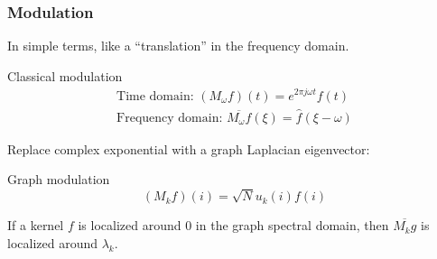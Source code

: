 \documentclass{beamer}
\begin{document}
\begin{frame}
  \frametitle{Modulation}

  In simple terms, like a ``translation'' in the frequency domain.
  
  \begin{block}{Classical modulation}
    \begin{equation}
      \begin{split}
        \text{Time domain: } (M_\omega f)(t) = e^{2 \pi j \omega t} f(t) \\
        \text{Frequency domain: } \overline{M_\omega f}(\xi) = \hat{f}(\xi -
        \omega)
      \end{split}
    \end{equation}
  \end{block}  

  Replace complex exponential with a graph Laplacian eigenvector:
  
  \begin{block}{Graph modulation}
    \begin{equation}
      (M_kf)(i) = \sqrt{N} u_k(i) f(i)
    \end{equation}
  \end{block}  

  If a kernel $f$ is localized around 0 in the graph spectral domain, then
  $\overline{M_kg}$ is localized around $\lambda_k$.
\end{frame}
\end{document}
